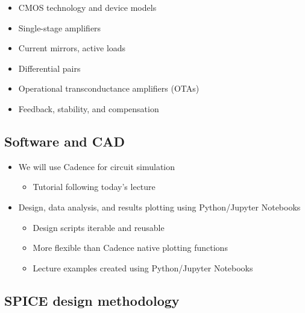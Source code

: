 \documentclass[11pt]{article}
\providecommand{\tightlist}{%
      \setlength{\itemsep}{0pt}\setlength{\parskip}{0pt}}
\begin{document}
    \begin{itemize}
\tightlist
\item
  CMOS technology and device models
\item
  Single-stage amplifiers
\item
  Current mirrors, active loads
\item
  Differential pairs
\item
  Operational transconductance amplifiers (OTAs)
\item
  Feedback, stability, and compensation
\end{itemize}

    \hypertarget{software-and-cad}{%
\subsection{Software and CAD}\label{software-and-cad}}

    \begin{itemize}
\tightlist
\item
  We will use Cadence for circuit simulation

  \begin{itemize}
  \tightlist
  \item
    Tutorial following today's lecture
  \end{itemize}
\item
  Design, data analysis, and results plotting using Python/Jupyter
  Notebooks

  \begin{itemize}
  \tightlist
  \item
    Design scripts iterable and reusable
  \item
    More flexible than Cadence native plotting functions
  \item
    Lecture examples created using Python/Jupyter Notebooks
  \end{itemize}
\end{itemize}

    \hypertarget{spice-design-methodology}{%
\subsection{SPICE design methodology}\label{spice-design-methodology}}
\end{document}
